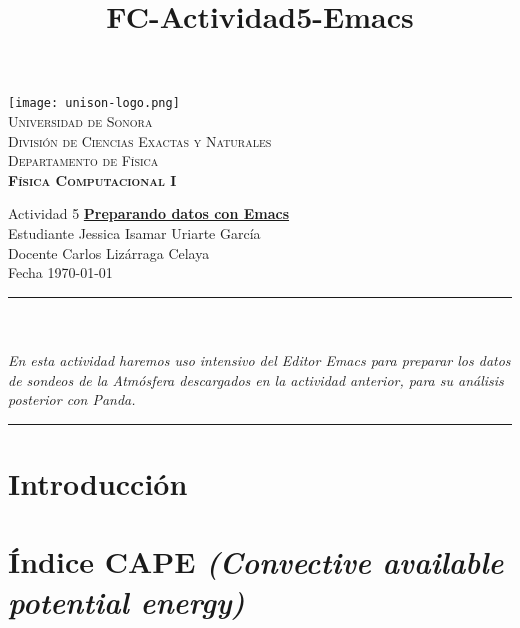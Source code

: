 \documentclass[12pt]{article}
\title{FC-Actividad5-Emacs}
\begin{document}

\begin{center}


\texttt{[image: unison-logo.png]}~\\[0.8cm]

\textsc{\LARGE Universidad de Sonora}\\[0.1cm]
\textsc{Divisi\'on de Ciencias Exactas y Naturales}\\[0.1cm]
\textsc{Departamento de F\'isica \\[0.5cm] \textbf{F\'isica Computacional I}}\\%

\end{center}
\noindent
Actividad 5 \dotfill \textbf{\underline{Preparando datos con Emacs}}\\
Estudiante \dotfill Jessica Isamar Uriarte Garc\'ia \\
Docente \dotfill Carlos Liz\'arraga Celaya \\
Fecha \dotfill \today \\
\rule{\linewidth}{0.5pt} \\[6pt] 
\abstractname{\\ \emph{ \scriptsize{  \baselinestretch En esta actividad haremos uso intensivo del Editor Emacs para preparar los datos de sondeos de la Atm\'osfera descargados en la actividad anterior,  para su an\'alisis posterior con Panda.\\} }}
\renewcommand{\baselinestretch}{0.6}
\rule{\linewidth}{2pt}  
\small\tableofcontents

\newpage

\section{Introducci\'on}
\noindent 


\section{Índice CAPE \emph{(Convective available potential energy)}}
\noindent
\end{document}
